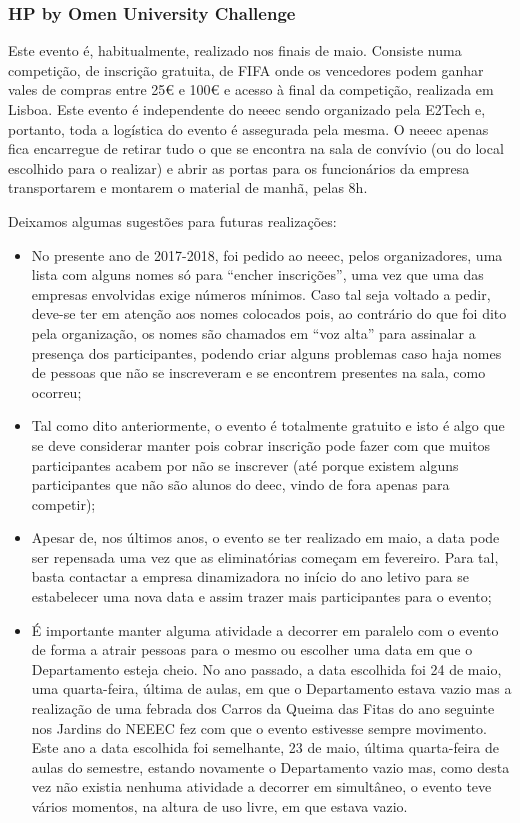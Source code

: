 
\subsubsection{HP by Omen University Challenge}

Este evento é, habitualmente, realizado nos finais de maio. Consiste numa competição, de inscrição gratuita, de FIFA onde os vencedores podem ganhar vales de compras entre 25€ e 100€ e acesso à final da competição, realizada em Lisboa. Este evento é independente do \acrshort{neeec} sendo organizado pela E2Tech e, portanto, toda a logística do evento é assegurada pela mesma. O \acrshort{neeec} apenas fica encarregue de retirar tudo o que se encontra na sala de convívio (ou do local escolhido para o realizar) e abrir as portas para os funcionários da empresa transportarem e montarem o material de manhã, pelas 8h.

Deixamos algumas sugestões para futuras realizações:
\begin{itemize}
\item No presente ano de 2017-2018, foi pedido ao \acrshort{neeec}, pelos organizadores, uma lista com alguns nomes só para “encher inscrições”, uma vez que uma das empresas envolvidas exige números mínimos. Caso tal seja voltado a pedir, deve-se ter em atenção aos nomes colocados pois, ao contrário do que foi dito pela organização, os nomes são chamados em “voz alta” para assinalar a presença dos participantes, podendo criar alguns problemas caso haja nomes de pessoas que não se inscreveram e se encontrem presentes na sala, como ocorreu;
\item Tal como dito anteriormente, o evento é totalmente gratuito e isto é algo que se deve considerar manter pois cobrar inscrição pode fazer com que muitos participantes acabem por não se inscrever (até porque existem alguns participantes que não são alunos do \acrshort{deec}, vindo de fora apenas para competir);
\item Apesar de, nos últimos anos, o evento se ter realizado em maio, a data pode ser repensada uma vez que as eliminatórias começam em fevereiro. Para tal, basta contactar a empresa dinamizadora no início do ano letivo para se estabelecer uma nova data e assim trazer mais participantes para o evento;
\item É importante manter alguma atividade a decorrer em paralelo com o evento de forma a atrair pessoas para o mesmo ou escolher uma data em que o Departamento esteja cheio. No ano passado, a data escolhida foi 24 de maio, uma quarta-feira, última de aulas, em que o Departamento estava vazio mas a realização de uma febrada dos Carros da Queima das Fitas do ano seguinte nos Jardins do NEEEC fez com que o evento estivesse sempre movimento. Este ano a data escolhida foi semelhante, 23 de maio, última quarta-feira de aulas do semestre, estando novamente o Departamento vazio mas, como desta vez não existia nenhuma atividade a decorrer em simultâneo, o evento teve vários momentos, na altura de uso livre, em que estava vazio.
\end{itemize}